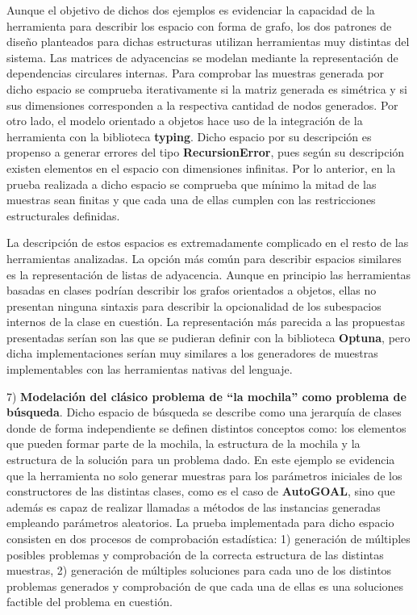 Aunque el objetivo de dichos dos ejemplos es evidenciar la capacidad de la herramienta para describir los espacio con forma
de grafo, los dos patrones de diseño planteados para dichas estructuras utilizan herramientas muy distintas del sistema. Las
matrices de adyacencias se modelan mediante la representación de dependencias circulares internas. Para comprobar las muestras
generada por dicho espacio se comprueba iterativamente si la matriz generada es simétrica y si sus dimensiones corresponden a
la respectiva cantidad de nodos generados. Por otro lado, el modelo orientado a objetos hace uso de la integración de la
herramienta con la biblioteca {\bf typing}. Dicho espacio por su descripción es propenso a generar errores del tipo {\bf RecursionError},
pues según su descripción existen elementos en el espacio con dimensiones infinitas. Por lo anterior, en la prueba realizada a
dicho espacio se comprueba que mínimo la mitad de las muestras sean finitas y que cada una de ellas cumplen con las
restricciones estructurales definidas.

La descripción de estos espacios es extremadamente complicado en el resto de las herramientas analizadas. La opción más común
para describir espacios similares es la representación de listas de adyacencia. Aunque en principio las herramientas basadas
en clases podrían describir los grafos orientados a objetos, ellas no presentan ninguna sintaxis para describir la opcionalidad
de los subespacios internos de la clase en cuestión. La representación más parecida a las propuestas presentadas serían son las que se pudieran
definir con la biblioteca {\bf Optuna}, pero dicha implementaciones serían muy similares a los generadores de muestras implementables
con las herramientas nativas del lenguaje.

7) {\bf Modelación del clásico problema de ``la mochila'' como problema de búsqueda}. Dicho espacio de búsqueda se describe como una
jerarquía de clases donde de forma independiente se definen distintos conceptos como: los elementos que pueden formar parte de
la mochila, la estructura de la mochila y la estructura de la solución para un problema dado. En este ejemplo se evidencia que la
herramienta no solo generar muestras para los parámetros iniciales de los constructores de las distintas clases, como es el caso de
      {\bf AutoGOAL}, sino que además es capaz de realizar llamadas a métodos de las instancias generadas empleando parámetros aleatorios. La
prueba implementada para dicho espacio consisten en dos procesos de comprobación estadística: 1) generación de múltiples posibles
problemas y comprobación de la correcta estructura de las distintas muestras, 2) generación de múltiples soluciones para cada uno
de los distintos problemas generados y comprobación de que cada una de ellas es una  soluciones factible del problema en cuestión.

